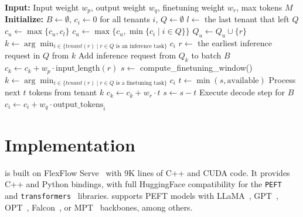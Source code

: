 \begin{algorithm}[htbp]
\caption{\FlexLLM with Virtual Token Counter for fair co-serving.}
\label{flexllm:alg:flexllm-vtc}
\begin{algorithmic}[1]
\State \textbf{Input:} Input weight $w_p$, output weight $w_q$, finetuning weight $w_r$, max tokens $M$
\State \textbf{Initialize:} $B \leftarrow \emptyset$, $c_i \leftarrow 0$ for all tenants $i$, $Q \leftarrow \emptyset$
\State
{}
                \State $l \gets$ the last tenant that left $Q$
                \State $c_u \gets \max\{c_u, c_l\}$
            \Else
                \State $c_u \gets \max\{c_u, \min\{c_i \mid i \in Q\}\}$
            \EndIf
        \EndIf
        \State $Q_u \leftarrow Q_u \cup \{r\}$
    \EndIf
\EndWhile
\State
{}
            \State $k \leftarrow \arg\min_{i \in \{\mathit{tenant}(r) \mid r \in Q \text{ is an inference task}\}} c_i$
            \State $r \gets$ the earliest inference request in $Q$ from $k$
            \State Add inference request from $Q_k$ to batch $B$
            \State $c_k \leftarrow c_k + w_p \cdot \text{input\_length}(r)$
        \EndWhile
        \State $s \leftarrow$ compute\_finetuning\_window()
            \State $k \leftarrow \arg\min_{i \in \{\mathit{tenant}(r) \mid r \in Q \text{ is a finetuning task}\}} c_i$
            \State $t \gets \min(s, \text{available})$
            \State Process next $t$ tokens from tenant $k$
            \State $c_k \gets c_k + w_r \cdot t$
            \State $s \leftarrow s - t$
        \EndWhile
    \EndIf
    \State Execute decode step for $B$
        \State $c_i \leftarrow c_i + w_q \cdot \text{output\_tokens}_i$
    \EndFor
\EndWhile
\end{algorithmic}
\end{algorithm}

\section{Implementation}
\label{flexllm:sec:impl}
\FlexLLM is built on FlexFlow Serve~\cite{specinfer} with 9K lines of C++ and CUDA code. It provides C++ and Python bindings, with full HuggingFace compatibility for the \texttt{PEFT}~\cite{peft} and \texttt{transformers}~\cite{transformers} libraries. \FlexLLM supports PEFT models with LLaMA~\cite{touvron2023llama}, GPT~\cite{brown2020language}, OPT~\cite{zhang2022opt}, Falcon~\cite{falcon40b}, or MPT~\cite{MosaicML2023Introducing} backbones, among others.


